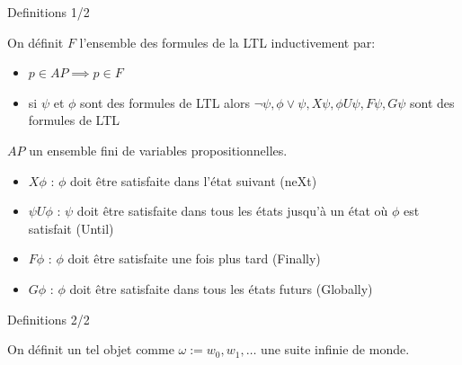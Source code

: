 \documentclass{beamer}
\begin{document}
\begin{frame}{Definitions 1/2}
    \begin{definition}
        On définit $F$ l'ensemble des formules de la LTL inductivement par:
        \begin{itemize}
            \item $p\in AP \implies p\in F$
            \item si $\psi$ et $\phi$ sont des formules de LTL alors $\lnot\psi, \phi\lor\psi, X\psi, \phi U\psi, F\psi, G\psi$ sont des formules de LTL
        \end{itemize}
        $AP$ un ensemble fini de variables propositionnelles.
    \end{definition}
    \pause
    \begin{definition}[Opérateurs X, U, F, G]
            \begin{itemize}
                \item $X\phi$ : $\phi$ doit être satisfaite dans l'état suivant (neXt)
                \item $\psi U\phi$ : $\psi$ doit être satisfaite dans tous les états jusqu'à un état où $\phi$ est satisfait (Until)
                \item $F\phi$ : $\phi$ doit être satisfaite une fois plus tard (Finally)
                \item $G\phi$ : $\phi$ doit être satisfaite dans tous les états futurs (Globally)
            \end{itemize}
    \end{definition}
\end{frame}

\begin{frame}{Definitions 2/2}
     \begin{definition}[Valuation]
        On définit un tel objet comme $\omega := w_0,w_1,\dots$ une suite infinie de monde.
    \end{definition}



\end{frame}
\end{document}
